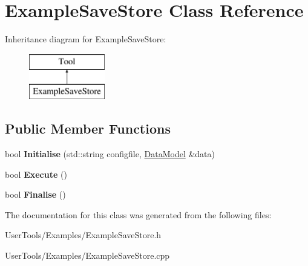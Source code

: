 \hypertarget{classExampleSaveStore}{\section{Example\-Save\-Store Class Reference}
\label{classExampleSaveStore}
}
Inheritance diagram for Example\-Save\-Store\-:\begin{figure}[H]
\begin{center}
\leavevmode
\includegraphics[height=2.000000cm]{classExampleSaveStore}
\end{center}
\end{figure}
\subsection*{Public Member Functions}
\begin{DoxyCompactItemize}
\item 
\hypertarget{classExampleSaveStore_a9c575471c5d024446e7b71b7340cc600}{bool {\bfseries Initialise} (std\-::string configfile, \hyperlink{classDataModel}{Data\-Model} \&data)}\label{classExampleSaveStore_a9c575471c5d024446e7b71b7340cc600}

\item 
\hypertarget{classExampleSaveStore_ab95ccff687c8114d6813a87c2bede948}{bool {\bfseries Execute} ()}\label{classExampleSaveStore_ab95ccff687c8114d6813a87c2bede948}

\item 
\hypertarget{classExampleSaveStore_aa28ea62a5f5bba4c04d271d502859e78}{bool {\bfseries Finalise} ()}\label{classExampleSaveStore_aa28ea62a5f5bba4c04d271d502859e78}

\end{DoxyCompactItemize}


The documentation for this class was generated from the following files\-:\begin{DoxyCompactItemize}
\item 
User\-Tools/\-Examples/Example\-Save\-Store.\-h\item 
User\-Tools/\-Examples/Example\-Save\-Store.\-cpp\end{DoxyCompactItemize}
